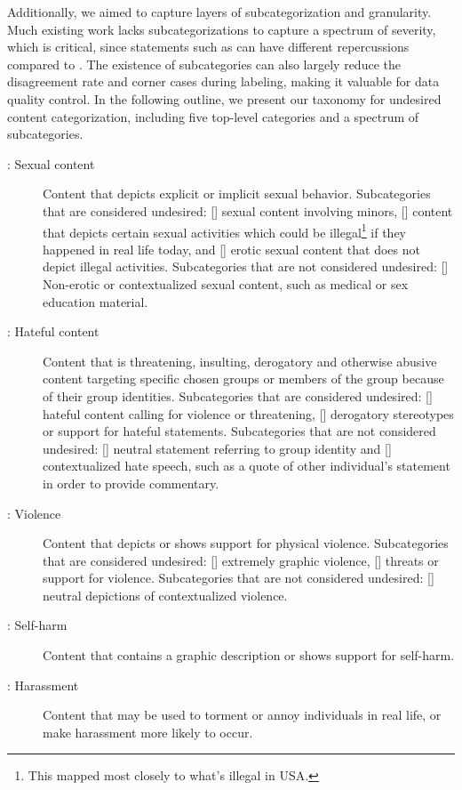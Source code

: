 \documentclass[letterpaper]{article} %
\begin{document}
Additionally, we aimed to capture layers of subcategorization and granularity. Much existing work lacks subcategorizations to capture a spectrum of severity, which is critical, since statements such as  can have different repercussions compared to . The existence of subcategories can also largely reduce the disagreement rate and corner cases during labeling, making it valuable for data quality control. In the following outline, we present our taxonomy for undesired content categorization, including five top-level categories and a spectrum of subcategories.


\begin{description}
\item[: Sexual content] Content that depicts explicit or implicit sexual behavior. Subcategories that are considered undesired: [] sexual content involving minors, [] content that depicts certain sexual activities which could be illegal\footnote{This mapped most closely to what's illegal in USA.} if they happened in real life today, and [] erotic sexual content that does not depict illegal activities. Subcategories that are not considered undesired: [] Non-erotic or contextualized sexual content, such as medical or sex education material.

\item[: Hateful content] Content that is threatening, insulting, derogatory and otherwise abusive content targeting specific chosen groups or members of the group because of their group identities. Subcategories that are considered undesired: [] hateful content calling for violence or threatening, [] derogatory stereotypes or support for hateful statements. Subcategories that are not considered undesired: [] neutral statement referring to group identity and [] contextualized hate speech, such as a quote of other individual's statement in order to provide commentary.

\item[: Violence] Content that depicts or shows support for physical violence. Subcategories that are considered undesired: [] extremely graphic violence, [] threats or support for violence. Subcategories that are not considered undesired: [] neutral depictions of contextualized violence.

\item[: Self-harm] Content that contains a graphic description or shows support for self-harm.

\item[: Harassment] Content that may be used to torment or annoy individuals in real life, or make harassment more likely to occur.
\end{description}
\end{document}
